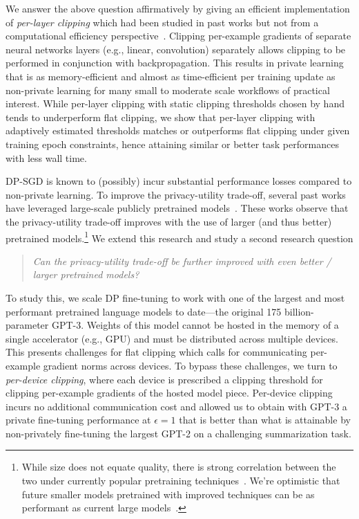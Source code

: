 We answer the above question affirmatively by giving an efficient implementation of \emph{per-layer clipping} which had been studied in past works but not from a computational efficiency perspective~\citep{mcmahan2018learning,dupuy2022efficient}. 
Clipping per-example gradients of separate neural networks layers (e.g., linear, convolution) separately allows clipping to be performed in conjunction with backpropagation. 
This results in private learning that is as memory-efficient and almost as time-efficient per training update as non-private learning for many small to moderate scale workflows of practical interest. 
While per-layer clipping with static clipping thresholds chosen by hand tends to underperform flat clipping, we show that per-layer clipping with adaptively estimated thresholds matches or outperforms flat clipping under given training epoch constraints, hence attaining similar or better task performances with less wall time.


DP-SGD is known to (possibly) incur substantial performance losses compared to non-private learning.
To improve the privacy-utility trade-off, several past works have leveraged large-scale publicly pretrained models~\citep{yu2022differentially,li2022large,de2022unlocking,mehta2022large}.
These works observe that the privacy-utility trade-off improves with the use of larger (and thus better) pretrained models.\footnote{While size does not equate quality, there is strong correlation between the two under currently popular pretraining techniques~\citep{liu2019roberta,brown2020language}. We're optimistic that future smaller models pretrained with improved techniques can be as performant as current large models~\citep{hoffmann2022training}. 
}
We extend this research and study a second research question 
\begin{quote}
	\centering
	\emph{Can the privacy-utility trade-off be further improved with even better / larger pretrained models?}
\end{quote}
To study this, we scale DP fine-tuning to work with one of the largest and most performant pretrained language models to date---the original 175 billion-parameter GPT-3.
Weights of this model cannot be hosted in the memory of a single accelerator (e.g., GPU) and must be distributed across multiple devices. 
This presents challenges for flat clipping which calls for communicating per-example gradient norms across devices. To bypass these challenges, we turn to \emph{per-device clipping}, where each device is prescribed a clipping threshold for clipping per-example gradients of the hosted model piece.
Per-device clipping incurs no additional communication cost and allowed us to obtain with GPT-3 a private fine-tuning performance at $\epsilon=1$ that is better than what is attainable by non-privately fine-tuning the largest GPT-2 on a challenging summarization task. 

